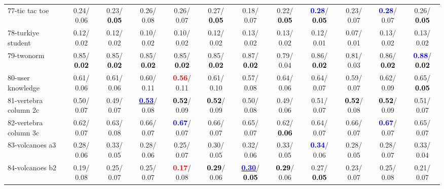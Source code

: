 \begin{table}[h]
\begin{center}
{\begin{tabular}{lc|c|c|c|c|c|c|c|c|c|c}
77-tic tac toe &   0.24/  0.06 &   0.23/\textcolor{black}{\textbf{  0.05}} &   0.26/  0.08 &   0.26/  0.07 &   0.27/\textcolor{black}{\textbf{  0.05}} &   0.18/  0.07 &   0.22/\textcolor{black}{\textbf{  0.05}} & \textcolor{blue}{\textbf{  0.28}}/\textcolor{black}{\textbf{  0.05}} &   0.23/  0.07 & \textcolor{blue}{\textbf{  0.28}}/  0.07 &   0.26/\textcolor{black}{\textbf{  0.05}} \\
78-turkiye student &   0.12/  0.02 &   0.12/  0.02 &   0.10/  0.02 &   0.10/  0.02 &   0.12/  0.02 &   0.13/  0.02 &   0.13/  0.02 &   0.12/  0.01 &   0.07/  0.01 &   0.13/  0.02 &   0.13/  0.02 \\ \hline
79-twonorm &   0.85/\textcolor{black}{\textbf{  0.02}} &   0.85/\textcolor{black}{\textbf{  0.02}} &   0.85/\textcolor{black}{\textbf{  0.02}} &   0.85/\textcolor{black}{\textbf{  0.02}} &   0.85/\textcolor{black}{\textbf{  0.02}} &   0.87/\textcolor{black}{\textbf{  0.02}} &   0.79/  0.04 &   0.86/\textcolor{black}{\textbf{  0.02}} &   0.81/  0.03 &   0.86/\textcolor{black}{\textbf{  0.02}} & \textcolor{blue}{\textbf{  0.88}}/\textcolor{black}{\textbf{  0.02}} \\
80-user knowledge &   0.61/  0.06 &   0.61/  0.06 &   0.60/  0.11 & \textcolor{red}{\textbf{  0.56}}/  0.11 &   0.61/  0.10 &   0.57/  0.08 &   0.64/  0.06 &   0.64/  0.07 &   0.59/  0.07 &   0.62/  0.09 &   0.65/\textcolor{black}{\textbf{  0.05}} \\
81-vertebra column 2c &   0.50/  0.07 &   0.49/  0.07 & \underline{\textcolor{blue}{\textbf{  0.53}}}/  0.08 & \textcolor{black}{\textbf{  0.52}}/  0.09 & \textcolor{black}{\textbf{  0.52}}/  0.09 &   0.50/  0.08 &   0.49/  0.06 &   0.51/  0.07 & \textcolor{black}{\textbf{  0.52}}/  0.08 & \textcolor{black}{\textbf{  0.52}}/  0.09 &   0.51/  0.07 \\
82-vertebra column 3c &   0.62/  0.07 &   0.63/  0.08 &   0.66/  0.07 & \textcolor{blue}{\textbf{  0.67}}/  0.07 &   0.66/  0.07 &   0.65/  0.07 &   0.62/\textcolor{black}{\textbf{  0.06}} &   0.64/  0.07 &   0.66/  0.07 & \textcolor{blue}{\textbf{  0.67}}/  0.07 &   0.65/  0.07 \\
83-volcanoes a3 &   0.28/  0.06 &   0.33/  0.05 &   0.28/  0.06 &   0.25/  0.07 &   0.30/  0.05 &   0.32/  0.06 &   0.33/  0.05 & \textcolor{blue}{\textbf{  0.34}}/  0.06 &   0.28/  0.05 &   0.28/  0.07 &   0.33/  0.04 \\
84-volcanoes b2 &   0.19/  0.08 &   0.25/  0.07 &   0.25/  0.07 & \textcolor{red}{\textbf{  0.17}}/  0.08 & \textcolor{black}{\textbf{  0.29}}/  0.06 & \underline{\textcolor{blue}{\textbf{  0.30}}}/\textcolor{black}{\textbf{  0.05}} & \textcolor{black}{\textbf{  0.29}}/  0.06 &   0.27/\textcolor{black}{\textbf{  0.05}} &   0.23/  0.07 &   0.25/  0.08 &   0.21/  0.07 \\

\end{tabular}}
\end{center}
\end{table}
